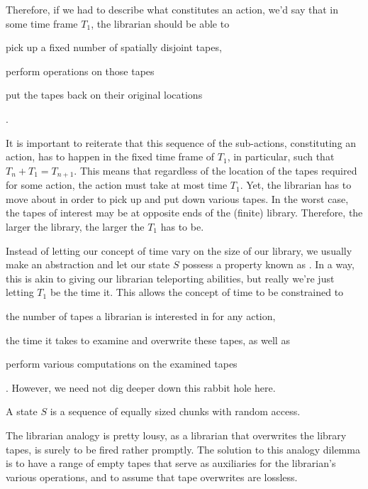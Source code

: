 Therefore, if we had to describe what constitutes an action, we'd say that in
some time frame $T_1$, the librarian should be able to \begin{inparaenum}[(1)]
\item pick up a fixed number of spatially disjoint tapes, \item perform
operations on those tapes \item put the tapes back on their original
locations\end{inparaenum}.

It is important to reiterate that this sequence of the sub-actions,
constituting an action, has to happen in the fixed time frame of $T_1$, in
particular, such that $T_n+T_1=T_{n+1}$.  This means that regardless of the
location of the tapes required for some action, the action must take at most
time $T_1$. Yet, the librarian has to move about in order to pick up and put
down various tapes. In the worst case, the tapes of interest may be at opposite
ends of the (finite) library. Therefore, the larger the library, the larger the
$T_1$ has to be. 

Instead of letting our concept of time vary on the size of our library, we
usually make an abstraction and let our state $S$ possess a property known as
. In a way, this is akin to giving our librarian teleporting
abilities, but really we're just letting $T_1$ be the time it. This allows the concept of time to be constrained to
\begin{inparaenum}[(1)] \item the number of tapes a librarian is interested in
for any action, \item the time it takes to examine and overwrite these tapes,
as well as \item perform various computations on the examined
tapes\end{inparaenum}. However, we need not dig deeper down this rabbit hole
here.

\begin{definition}

A state $S$ is a sequence of equally sized chunks with random access.

\end{definition}

The librarian analogy is pretty lousy, as a librarian that overwrites the
library tapes, is surely to be fired rather promptly. The solution to this
analogy dilemma is to have a range of empty tapes that serve as auxiliaries for
the librarian's various operations, and to assume that tape overwrites are
lossless. 

